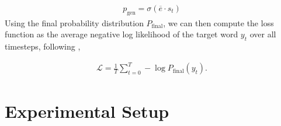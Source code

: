 \documentclass[11pt]{article}
\begin{document}
{
\vspace{-4mm}
\small
\begin{align}
     p_{\text{gen}} = \sigma(\overline{e} \cdot s_t)
\end{align}
}
Using the final probability distribution $P_{\text{final}}$, we can then compute the loss function as the average negative log likelihood of the target word $y_t$ over all timesteps, following \citet{see-etal-2017-get},

{
\vspace{-4mm}
\small
\begin{align}
     \mathcal{L} = \frac{1}{T}\sum_{t=0}^{T}-\log P_{\text{final}}(y_t).
\end{align}
}
 \section{Experimental Setup}
\end{document}
